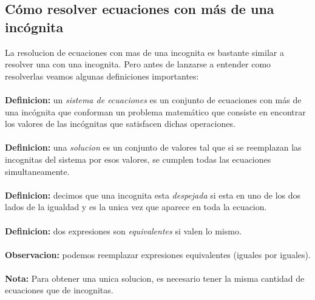 \documentclass{article}
\begin{document}
\subsection{Cómo resolver ecuaciones con más de una incógnita}
\begin{normalsize}
La resolucion de ecuaciones con mas de una incognita es bastante similar a resolver una con una incognita.
Pero antes de lanzarse a entender como resolverlas veamos algunas definiciones importantes:\\\\
\textbf{Definicion:} un \textit{sistema de ecuaciones} es un conjunto de ecuaciones con más de una incógnita que conforman un problema matemático que consiste en encontrar los valores de las incógnitas que satisfacen dichas operaciones.\\\\
\textbf{Definicion:} una \textit{solucion} es un conjunto de valores tal que si se reemplazan las incognitas del sistema por esos valores, se cumplen todas las ecuaciones simultaneamente.\\\\
\textbf{Definicion:} decimos que una incognita esta \textit{despejada} si esta en uno de los dos lados de la igualdad y es la unica vez que aparece en toda la ecuacion.\\\\
\textbf{Definicion:} dos expresiones son \textit{equivalentes} si valen lo mismo.\\\\
\textbf{Observacion:} podemos reemplazar expresiones equivalentes (iguales por iguales).\\\\
\textbf{Nota:} Para obtener una unica solucion, es necesario tener la misma cantidad de ecuaciones que de incognitas.
\\\\
\end{normalsize}
\end{document}
